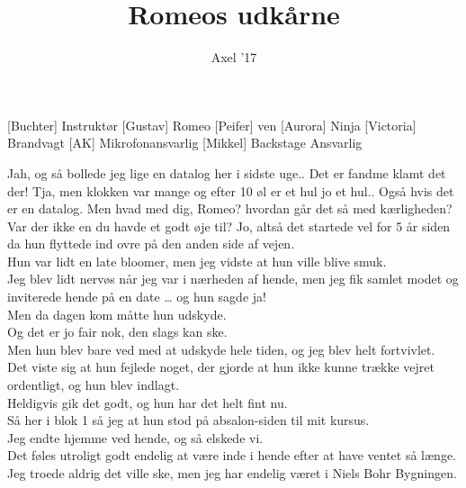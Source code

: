 \documentclass[a4paper,11pt]{article}
\title{Romeos udk\aa rne}
\author{Axel '17}
\begin{document}
\maketitle

\begin{roles}
[Buchter] Instruktør
[Gustav] Romeo
[Peifer] ven
[Aurora] Ninja
[Victoria] Brandvagt
[AK] Mikrofonansvarlig
[Mikkel] Backstage Ansvarlig
\end{roles}



\begin{sketch}

 Jah, og så bollede jeg lige en datalog her i sidste uge..
 Det er fandme klamt det der!
 Tja, men klokken var mange og efter 10 øl er et hul jo et hul.. Også hvis det er en datalog.
 Men hvad med dig, Romeo? hvordan går det så med kærligheden? Var der ikke en du havde et godt øje til?
 Jo, altså det startede vel for 5 år siden da hun flyttede ind ovre på den anden side af vejen.\\
Hun var lidt en late bloomer, men jeg vidste at hun ville blive smuk.\\
Jeg blev lidt nervøs når jeg var i nærheden af hende, men jeg fik samlet modet og inviterede hende på en date … og hun sagde ja!\\
Men da dagen kom måtte hun udskyde.\\
Og det er jo fair nok, den slags kan ske.\\
Men hun blev bare ved med at udskyde hele tiden, og jeg blev helt fortvivlet.\\
Det viste sig at hun fejlede noget, der gjorde at hun ikke kunne trække vejret ordentligt, og hun blev indlagt.\\
Heldigvis gik det godt, og hun har det helt fint nu.\\
Så her i blok 1 så jeg at hun stod på absalon-siden til mit kursus.\\
Jeg endte hjemme ved hende, og så elskede vi. \\
Det føles utroligt godt endelig at være inde i hende efter at have ventet så længe.\\
Jeg troede aldrig det ville ske, 
men jeg har endelig været i Niels Bohr Bygningen.\\


\end{sketch}
\end{document}
